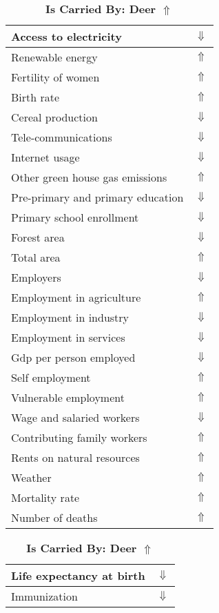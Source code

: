 \documentclass[12pt,notitlepage,oneside]{report}
\begin{document}
\clearpage
\begin{table}[!htb]
\caption{\textbf{Is Carried By: Deer $\Uparrow$}}
\centering
\label{Correlated Socio-economic Factors0}
\begin{tabular}{|l|l|}
\hline
Access to electricity & $\Downarrow$\\ \hline
Renewable energy & $\Uparrow$\\ \hline
Fertility of women & $\Uparrow$\\ \hline
Birth rate & $\Uparrow$\\ \hline
Cereal production & $\Downarrow$\\ \hline
Tele-communications & $\Downarrow$\\ \hline
Internet usage & $\Downarrow$\\ \hline
Other green house gas emissions & $\Uparrow$\\ \hline
Pre-primary and primary education & $\Downarrow$\\ \hline
Primary school enrollment & $\Downarrow$\\ \hline
Forest area & $\Downarrow$\\ \hline
Total area & $\Uparrow$\\ \hline
Employers & $\Downarrow$\\ \hline
Employment in agriculture & $\Uparrow$\\ \hline
Employment in industry & $\Downarrow$\\ \hline
Employment in services & $\Downarrow$\\ \hline
Gdp per person employed & $\Downarrow$\\ \hline
Self employment & $\Uparrow$\\ \hline
Vulnerable employment & $\Uparrow$\\ \hline
Wage and salaried workers & $\Downarrow$\\ \hline
Contributing family workers & $\Uparrow$\\ \hline
Rents on natural resources & $\Uparrow$\\ \hline
Weather & $\Uparrow$\\ \hline
Mortality rate & $\Uparrow$\\ \hline
Number of deaths & $\Uparrow$\\ \hline
\end{tabular}
\begin{tabular}{|l|l|}
\hline
Life expectancy at birth & $\Downarrow$\\ \hline
Immunization & $\Downarrow$\\ \hline

\end{tabular}
\end{table}
\end{document}
